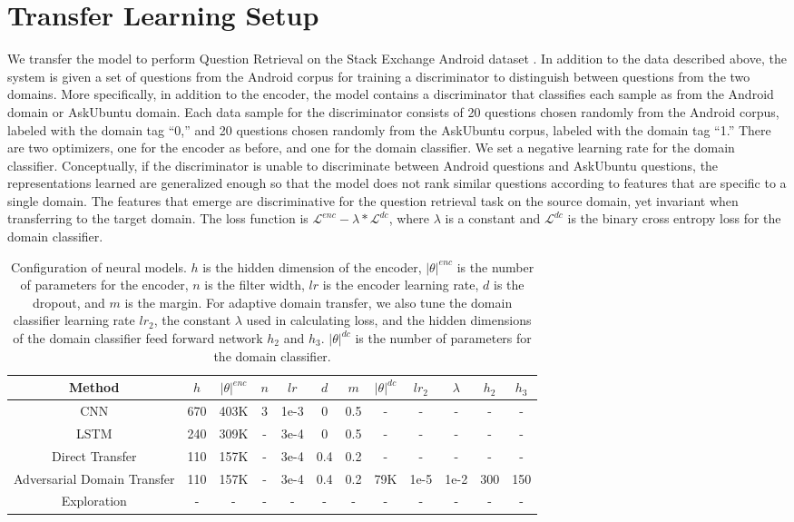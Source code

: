 \documentclass[11pt,a4paper]{article}
\begin{document}
\section{Transfer Learning Setup}
We transfer the model to perform Question Retrieval on the Stack Exchange Android dataset \cite{guo}. In addition to the data described above, the system is given a set of questions from the Android corpus for training a discriminator to distinguish between questions from the two domains. More specifically, in addition to the encoder, the model contains a discriminator that classifies each sample as from the Android domain or AskUbuntu domain. Each data sample for the discriminator consists of 20 questions chosen randomly from the Android corpus, labeled with the domain tag “0,” and 20 questions chosen randomly from the AskUbuntu corpus, labeled with the domain tag “1.” There are two optimizers, one for the encoder as before, and one for the domain classifier. We set a negative learning rate for the domain classifier. Conceptually, if the discriminator is unable to discriminate between Android questions and AskUbuntu questions, the representations learned are generalized enough so that the model does not rank similar questions according to features that are specific to a single domain. The features that emerge are discriminative for the question retrieval task on the source domain, yet invariant when transferring to the target domain. The loss function is $\mathcal{L}^{enc} - \lambda* \mathcal{L}^{dc}$, where $\lambda$ is a constant and  $\mathcal{L}^{dc}$ is the binary cross entropy loss for the domain classifier.

\begin{table*}[ht]
\centering
\begin{tabular}{c|ccccccccccc}
\hline
Method & $h$ & $|\theta|^{enc}$ & $n$ & $lr$ & $d$ & $m$ & $|\theta|^{dc}$ & $lr_2$ & $\lambda$ & $h_2$ & $h_3$ \\
\hline
CNN     & 670 & 403K & 3 & 1e-3 & 0 & 0.5 & - & - & - & - & -\\
LSTM    & 240 & 309K & - & 3e-4 & 0 & 0.5 & - & - & - & - & -\\
Direct Transfer & 110 & 157K & - & 3e-4 & 0.4 & 0.2 & - & - & - & - & -\\
Adversarial Domain Transfer & 110 & 157K & - & 3e-4 & 0.4 & 0.2 & 79K & 1e-5 & 1e-2 & 300 & 150\\
Exploration & - & - & - & - & - & - & - & - & - & - & -\\
\hline
\end{tabular}
\caption{Configuration of neural models. $h$ is the hidden dimension of the encoder, $|\theta|^{enc}$ is the number of parameters for the encoder, $n$ is the filter width, $lr$ is the encoder learning rate, $d$ is the dropout, and $m$ is the margin. For adaptive domain transfer, we also tune the domain classifier learning rate $lr_2$, the constant $\lambda$ used in calculating loss, and the hidden dimensions of the domain classifier feed forward network $h_2$ and $h_3$. $|\theta|^{dc}$ is the number of parameters for the domain classifier. }
\label{table1}
\end{table*}
\end{document}
